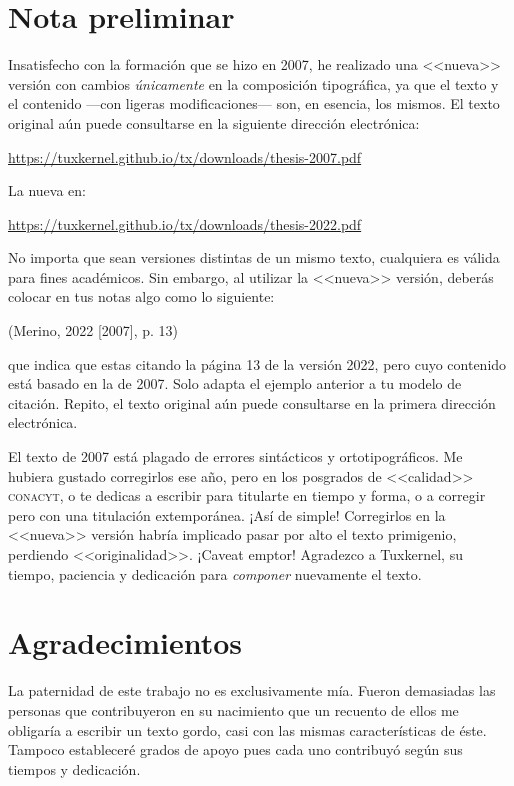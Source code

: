 \documentclass[14pt,twoside,final]{extbook} %
\begin{document}
\chapter*{Nota preliminar}\label{ch:nota-preliminar}
Insatisfecho con la formación que se hizo en 2007, he realizado una <<nueva>> versión con cambios \emph{únicamente} en la composición tipográfica, ya que el texto y el contenido ---con ligeras modificaciones--- son, en esencia, los mismos. El texto original aún puede consultarse en la siguiente dirección electrónica:
\begin{center}
\url{https://tuxkernel.github.io/tx/downloads/thesis-2007.pdf}
\end{center}
La nueva en:
\begin{center}
\url{https://tuxkernel.github.io/tx/downloads/thesis-2022.pdf}
\end{center}
No importa que sean versiones distintas de un mismo texto, cualquiera es válida para fines académicos. Sin embargo, al utilizar la <<nueva>> versión, deberás colocar en tus notas algo como lo siguiente:
\begin{center}
(Merino, 2022 [2007], p. 13)
\end{center}
\noindent que indica que estas citando la página 13 de la versión 2022, pero cuyo contenido está basado en la de 2007. Solo adapta el ejemplo anterior a tu modelo de citación. Repito, el texto original aún puede consultarse en la primera dirección electrónica.

El texto de 2007 está plagado de errores sintácticos y ortotipográficos. Me hubiera gustado corregirlos ese año, pero en los posgrados de <<calidad>> \textsc{conacyt}, o te dedicas a escribir para titularte en tiempo y forma, o a corregir pero con una titulación extemporánea. ¡Así de simple! Corregirlos en la <<nueva>> versión habría implicado pasar por alto el texto primigenio, perdiendo <<originalidad>>. ¡Caveat emptor! Agradezco a Tuxkernel, su tiempo, paciencia y dedicación para \emph{componer} nuevamente el texto.
\chapter*{Agradecimientos}\label{ch:agradecimientos}
\thispagestyle{empty}
\pagestyle{fancy}
\fancyhf{} %
\fancyhead[LE,RO]{\thepage}
\renewcommand{\headrulewidth}{0pt}
\setcounter{page}{7}
La paternidad de este trabajo no es exclusivamente mía. Fueron demasiadas las personas que contribuyeron en su nacimiento que un recuento de ellos me obligaría a escribir un texto gordo, casi con las mismas características de éste. Tampoco estableceré grados de apoyo pues cada uno contribuyó según sus tiempos y dedicación.
\end{document}
